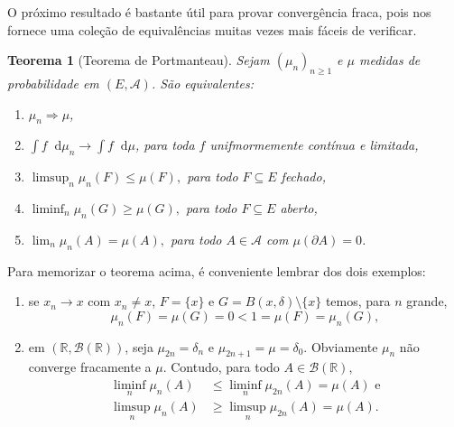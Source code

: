 \documentclass[reqno, draft]{book}
\newcommand*\1{\mathds{1}}
\newtheorem{theorem}{Teorema}[section]
\renewcommand*\d{\mathop{}\!\mathrm{d}}
\begin{document}
O próximo resultado é bastante útil para provar convergência fraca, pois nos fornece uma coleção de equivalências muitas vezes mais fáceis de verificar.

\begin{theorem}[Teorema de Portmanteau]
  \label{t:portmanteau}
  Sejam $(\mu_n)_{n \geq 1}$ e $\mu$ medidas de probabilidade em $(E, \mathcal{A})$.
  São equivalentes:
  \begin{enumerate}[\quad a)]
  \item[a)] $\mu_n \Rightarrow \mu$,
  \item[a')] $\int f \d \mu_n \to \int f \d \mu$, para toda $f$ unifmormemente contínua e limitada,
  \item[b)] $\limsup_n \mu_n(F) \leq \mu(F),$ para todo $F \subseteq E$ fechado,
  \item[b')] $\liminf_n \mu_n(G) \geq \mu(G),$ para todo $F \subseteq E$ aberto,
  \item[c)] $\lim_n \mu_n(A) = \mu(A),$ para todo $A \in \mathcal{A}$ com $\mu(\partial A) = 0$.
  \end{enumerate}
\end{theorem}

Para memorizar o teorema acima, é conveniente lembrar dos dois exemplos:
\begin{enumerate}[\quad i)]
  \item se $x_n \to x$ com $x_n \neq x$, $F = \{x\}$ e $G = B(x, \delta) \setminus \{x\}$ temos, para $n$ grande,
    \begin{equation}
      \mu_n(F) = \mu(G) = 0 < 1 = \mu(F) = \mu_n(G),
    \end{equation}
  \item em $(\mathbb{R},\mathcal{B}(\mathbb{R}))$, seja $\mu_{2n} = \delta_n$ e $\mu_{2n+1} = \mu = \delta_0$.
    Obviamente $\mu_n$ não converge fracamente a $\mu$. Contudo, para todo $A \in \mathcal{B}(\mathbb{R})$,
    \begin{equation}
      \begin{split}
        \liminf_n \mu_n (A) & \leq \liminf_n \mu_{2n}(A) = \mu(A) \text{ e}\\
        \limsup_n \mu_n (A) & \geq \limsup_n \mu_{2n}(A) = \mu(A).
      \end{split}
    \end{equation}
\end{enumerate}
\end{document}

